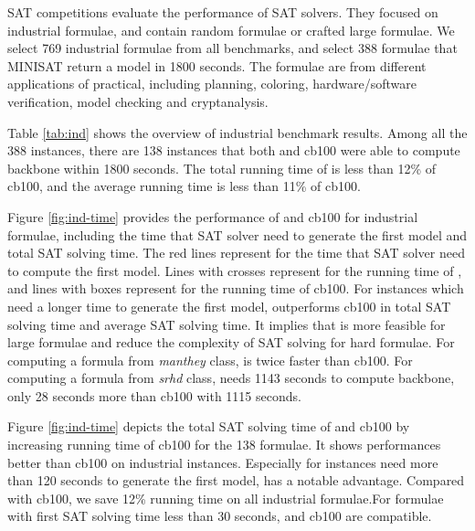 SAT competitions evaluate the performance of SAT solvers. They focused on industrial formulae, and contain random formulae or crafted large formulae. We select 769 industrial formulae from all benchmarks, and select 388 formulae that MINISAT return a model in 1800 seconds. The formulae are from different applications of practical, including planning, coloring, hardware/software verification, model checking and cryptanalysis.

Table \ref{tab:ind} shows the overview of industrial benchmark results. Among all the 388 instances, there are 138 instances that both \tool and cb100 were able to compute backbone within 1800 seconds. The total running time of \tool is less than 12\% of cb100, and the average running time is less than 11\% of cb100.

Figure \ref{fig:ind-time} provides the performance of \tool and cb100 for industrial formulae, including the time that SAT solver need to generate the first model and total SAT solving time. The red lines represent for the time that SAT solver need to compute the first model. Lines with crosses represent for the running time of \tool, and lines with boxes represent for the running time of cb100. For instances which need a longer time to generate the first model, \tool outperforms cb100 in total SAT solving time and average SAT solving time. It implies that \tool is more feasible for large formulae and reduce the complexity of SAT solving for hard formulae. 
For computing a formula from \emph{manthey} class, \tool is twice faster than cb100.
For computing a formula from \emph{srhd} class, \tool needs 1143 seconds to compute backbone, only 28 seconds more than cb100 with 1115 seconds.
 

Figure \ref{fig:ind-time} depicts the total SAT solving time of \tool and cb100 by increasing running time of cb100 for the 138 formulae. It shows  \tool performances better than cb100 on industrial instances. Especially for instances need more than 120 seconds to generate the first model, \tool has a notable advantage. Compared with cb100, we save 12\% running time on all industrial formulae.For formulae with first SAT solving time less than 30 seconds, \tool and cb100 are compatible.

